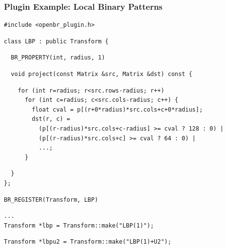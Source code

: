 \documentclass[12pt]{beamer}
\begin{document}
\begin{frame}[fragile]
\frametitle{Plugin Example: Local Binary Patterns}
{\footnotesize
\pause
\begin{verbatim}
#include <openbr_plugin.h>
\end{verbatim}
\vspace{-24pt}
\pause
\begin{verbatim}
class LBP : public Transform {
\end{verbatim}
\vspace{-24pt}
\pause
\begin{verbatim}
  BR_PROPERTY(int, radius, 1)
\end{verbatim}
\vspace{-24pt}
\pause
\begin{verbatim}
  void project(const Matrix &src, Matrix &dst) const {
\end{verbatim}
\vspace{-24pt}
\pause
\begin{verbatim}
    for (int r=radius; r<src.rows-radius; r++)
      for (int c=radius; c<src.cols-radius; c++) {
        float cval = p[(r+0*radius)*src.cols+c+0*radius];
        dst(r, c) =
          (p[(r-radius)*src.cols+c-radius] >= cval ? 128 : 0) |
          (p[(r-radius)*src.cols+c] >= cval ? 64 : 0) |
          ...;
      }
\end{verbatim}
\vspace{-24pt}
\pause
\begin{verbatim}
  }
};
\end{verbatim}
\vspace{-24pt}
\pause
\begin{verbatim}
BR_REGISTER(Transform, LBP)
\end{verbatim}
\vspace{-24pt}
\pause
\begin{verbatim}
...
Transform *lbp = Transform::make("LBP(1)");
\end{verbatim}
\vspace{-24pt}
\pause
\begin{verbatim}
Transform *lbpu2 = Transform::make("LBP(1)+U2");
\end{verbatim}
}
\end{frame}
\end{document}
